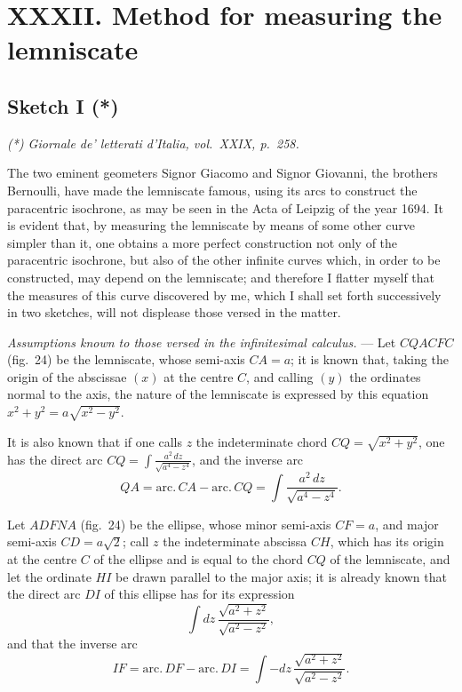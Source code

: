 \documentclass{article}
\begin{document}
\section*{XXXII. Method for measuring the lemniscate}
\subsection*{Sketch I (*)}
\emph{(*) Giornale de' letterati d'Italia, vol.~XXIX, p.~258.}

The two eminent geometers Signor Giacomo and Signor Giovanni, the brothers Bernoulli, have
made the lemniscate famous, using its arcs to construct the paracentric isochrone, as may be
seen in the Acta of Leipzig of the year 1694. It is evident that, by measuring the lemniscate
by means of some other curve simpler than it, one obtains a more perfect construction not only
of the paracentric isochrone, but also of the other infinite curves which, in order to be
constructed, may depend on the lemniscate; and therefore I flatter myself that the measures of
this curve discovered by me, which I shall set forth successively in two sketches, will not
displease those versed in the matter.

\emph{Assumptions known to those versed in the infinitesimal calculus.} --- Let $CQACFC$
(fig.~24) be the lemniscate, whose semi-axis $CA = a$; it is known that, taking the origin of
the abscissae $(x)$ at the centre $C$, and calling $(y)$ the ordinates normal to the axis, the
nature of the lemniscate is expressed by this equation $x^{2} + y^{2} = a\sqrt{x^{2} - y^{2}}$.

It is also known that if one calls $z$ the indeterminate chord $CQ = \sqrt{x^{2} + y^{2}}$, one
has the direct arc $CQ = \displaystyle\int \frac{a^{2}\,dz}{\sqrt{a^{4} - z^{4}}}$, and the
inverse arc
\[ QA = \mathrm{arc.}\,CA - \mathrm{arc.}\,CQ = \int \frac{a^{2}\,dz}{\sqrt{a^{4} - z^{4}}}. \]

Let $ADFNA$ (fig.~24) be the ellipse, whose minor semi-axis $CF = a$, and major semi-axis
$CD = a\sqrt{2}$; call $z$ the indeterminate abscissa $CH$, which has its origin at the centre
$C$ of the ellipse and is equal to the chord $CQ$ of the lemniscate, and let the ordinate $HI$
be drawn parallel to the major axis; it is already known that the direct arc $DI$ of this
ellipse has for its expression
\[ \int dz\, \frac{\sqrt{a^{2} + z^{2}}}{\sqrt{a^{2} - z^{2}}}, \]
and that the inverse arc
\[ IF = \mathrm{arc.}\,DF - \mathrm{arc.}\,DI = \int -dz\, \frac{\sqrt{a^{2} + z^{2}}}{\sqrt{a^{2} - z^{2}}}. \]
\end{document}
